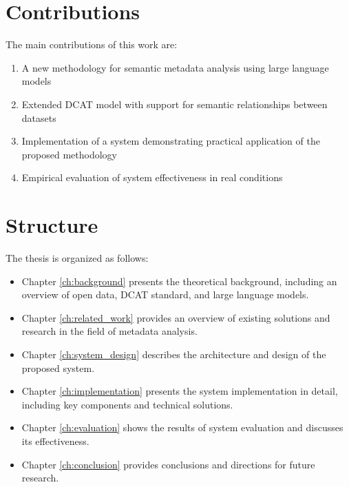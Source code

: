 \section*{Contributions}
The main contributions of this work are:

\begin{enumerate}
    \item A new methodology for semantic metadata analysis using large language models
    \item Extended DCAT model with support for semantic relationships between datasets
    \item Implementation of a system demonstrating practical application of the proposed methodology
    \item Empirical evaluation of system effectiveness in real conditions
\end{enumerate}

\section*{Structure}
The thesis is organized as follows:

\begin{itemize}
    \item Chapter \ref{ch:background} presents the theoretical background, including an 
    overview of open data, DCAT standard, and large language models.
    
    \item Chapter \ref{ch:related_work} provides an overview of existing solutions and 
    research in the field of metadata analysis.
    
    \item Chapter \ref{ch:system_design} describes the architecture and design of the 
    proposed system.
    
    \item Chapter \ref{ch:implementation} presents the system implementation in detail, 
    including key components and technical solutions.
    
    \item Chapter \ref{ch:evaluation} shows the results of system evaluation and 
    discusses its effectiveness.
    
    \item Chapter \ref{ch:conclusion} provides conclusions and directions for future 
    research.
\end{itemize} 